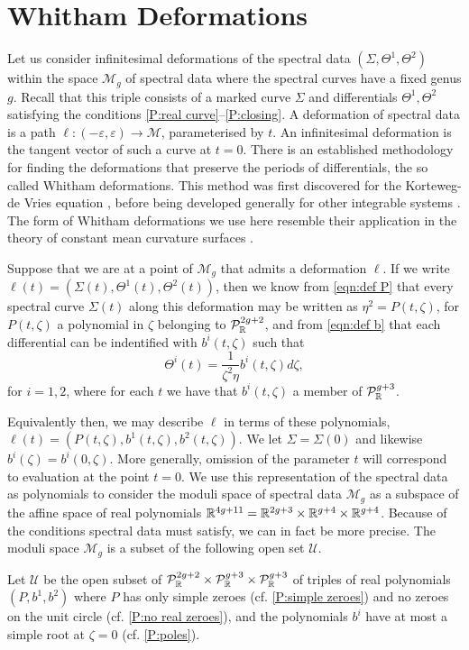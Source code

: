\section{Whitham Deformations}
Let us consider infinitesimal deformations of the spectral data $(Σ,Θ^1,Θ^2)$ within the space $\mathcal{M}_g$ of spectral data where the spectral curves have a fixed genus $g$. Recall that this triple consists of a marked curve $Σ$ and differentials $Θ^1, Θ^2$ satisfying the conditions \ref{P:real curve}--\ref{P:closing}.
A deformation of spectral data is a path $\ell:(-ε,ε) \to \mathcal{M}$, parameterised by $t$. An infinitesimal deformation is the tangent vector of such a curve at $t=0$.
There is an established methodology for finding the deformations that preserve the periods of differentials, the so called Whitham deformations. This method was first discovered for the Korteweg-de Vries equation \cite{Flaschka1980,Lax1983}, before being developed generally for other integrable systems \cite{Krichever1995}. The form of Whitham deformations we use here resemble their application in the theory of constant mean curvature surfaces \cite{Kilian2015a,Carberry2016}.

Suppose that we are at a point of $\mathcal{M}_g$ that admits a deformation $\ell$. If we write $\ell(t) = (Σ(t),Θ^1(t),Θ^2(t))$, then we know from \eqref{eqn:def P} that every spectral curve $Σ(t)$ along this deformation may be written as $η^2 = P(t,ζ)$, for $P(t,ζ)$ a polynomial in $ζ$ belonging to $\mathcal{P}^{2g+2}_\R$, and from \eqref{eqn:def b} that each differential can be indentified with $b^i(t,ζ)$ such that
\[
Θ^i(t) = \frac{1}{ζ^2η}b^i(t,ζ) dζ,
\]
for $i=1,2$, where for each $t$ we have that $b^i(t,ζ)$ a member of $\mathcal{P}^{g+3}_\R$.

Equivalently then, we may describe $\ell$ in terms of these polynomials, $\ell(t) = (P(t,ζ),b^1(t,ζ),b^2(t,ζ))$.
We let $Σ = Σ(0)$ and likewise $b^i(ζ) = b^i(0,ζ)$.
More generally, omission of the parameter $t$ will correspond to evaluation at the point $t=0$. We use this representation of the spectral data as polynomials to consider the moduli space of spectral data $\mathcal{M}_g$ as a subspace of the affine space of real polynomials $\R^{4g+11} = \R^{2g+3}\times\R^{g+4}\times\R^{g+4}$. Because of the conditions spectral data must satisfy, we can in fact be more precise. The moduli space $\mathcal{M}_g$ is a subset of the following open set $\mathcal{U}$.

\begin{defn}
\label{def:def U}
Let $\mathcal{U}$ be the open subset of $\mathcal{P}^{2g+2}_\R\times \mathcal{P}^{g+3}_\R\times\mathcal{P}^{g+3}_\R$ of triples of real polynomials $(P,b^1,b^2)$ where
$P$ has only simple zeroes (cf. \ref{P:simple zeroes}) and no zeroes on the unit circle (cf. \ref{P:no real zeroes}), and the polynomials $b^i$ have at most a simple root at $ζ=0$ (cf. \ref{P:poles}).
\end{defn}

